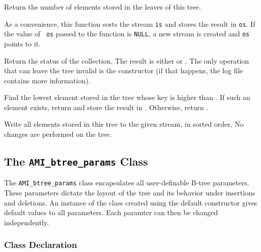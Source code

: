     {Return the number of elements
   stored in the leaves of this tree.}

    {As a convenience, this function sorts the
   stream {\tt is} and stores the result in {\tt os}. If the value of {\tt
   os} passed to the function is {\tt NULL}, a new stream is created and
   {\tt os} points to it.}

    {Return the status
   of the collection. The result is either
    or
   . The only operation that can leave
   the tree invalid is the constructor (if that happens, the log file
   contains more information).}

    {Find the lowest
   element stored in the tree whose key is higher than . If such
   an element exists, return  and store the result in
   . Otherwise, return .}

    {Write all
   elements stored in this tree to the given stream, in sorted order. No
   changes are performed on the tree.}

\etabb

\subsection{The {\tt AMI\_btree\_params} Class}\label{ssec:params}
The {\tt AMI\_btree\_params} class encapsulates all user-definable B-tree
parameters. These parameters dictate the layout of the tree and its
behavior under insertions and deletions. An instance of the class created
using the default constructor gives default values to all parameters. Each
paramter can then be changed independently.

\subsubsection{Class Declaration}

